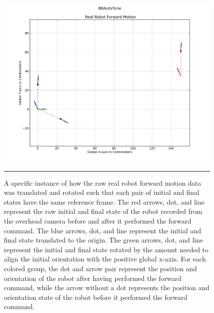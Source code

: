 \begin{figure}[htbp]
\centering
\includegraphics[scale=0.6]{../Figures/Chapter4/real_robot_raw_trans_rot.png}
\rule{35em}{0.5pt}
\caption[Real Robot Forward Motion Data Translated and Rotated Example]{A specific instance of how the raw real robot forward motion data was translated and rotated such that each pair of initial and final states have the same reference frame. The red arrows, dot, and line represent the raw initial and final state of the robot recorded from the overhead camera before and after it performed the forward command. The blue arrows, dot, and line represent the initial and final state translated to the origin. The green arrows, dot, and line represent the initial and final state rotated by the amount needed to align the initial orientation with the positive global x-axis. For each colored group, the dot and arrow pair represent the position and orientation of the robot after having performed the forward command, while the arrow without a dot represents the position and orientation state of the robot before it performed the forward command.}
\label{fig:real_robot_raw_trans_rot}
\end{figure}

